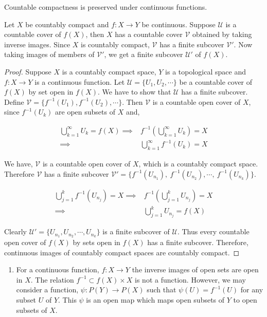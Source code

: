 \begin{theorem}
	Countable compactness is preserved under continuous functions.\cite[11.1.2]{joshi}
\end{theorem}
\begin{synopsis}
	Let $X$ be countably compact and $f:X\to Y$ be continuous. Suppose $\mathcal{U}$ is a countable cover of $f(X)$, then $X$ has a countable cover $\mathcal{V}$ obtained by taking inverse images. Since $X$ is countably compact, $\mathcal{V}$ has a finite subcover $\mathcal{V}'$. Now taking images of members of $\mathcal{V}'$, we get a finite subcover $\mathcal{U}'$ of $f(X)$.
\end{synopsis}
\begin{proof}
	Suppose $X$ is a countably compact space, $Y$ is a topological space and $f:X \to Y$ is a continuous function. Let $\mathcal{U} = \{ U_1, U_2,\cdots \}$ be a countable cover of $f(X)$ by set open in $f(X)$. We have to show that $\mathcal{U}$ has a finite subcover.\\

	Define $\mathcal{V} = \{ f^{-1}(U_1), f^{-1}(U_2), \cdots \}$. Then $\mathcal{V}$ is a countable open cover of $X$, since $f^{-1}(U_k)$ are open subsets of $X$ and,

\begin{align*}
	\bigcup_{k = 1}^\infty U_k = f(X) \implies & f^{-1}\left(\bigcup_{k=1}^\infty U_k\right) = X\\
	\implies & \bigcup_{k = 1}^\infty f^{-1}(U_k) = X
\end{align*}

	We have, $\mathcal{V}$ is a countable open cover of $X$, which is a countably compact space. Therefore $\mathcal{V}$ has a finite subcover $\mathcal{V}' = \{ f^{-1}(U_{n_1}),\ f^{-1}(U_{n_2}),\cdots,\ f^{-1}(U_{n_k}) \}$.

\begin{align*}
	\bigcup_{j=1}^k f^{-1}(U_{n_j}) = X \implies & f^{-1}\left(\bigcup_{j=1}^k U_{n_j}\right) = X\\
	\implies & \bigcup_{j=1}^k U_{n_j} = f(X)
\end{align*}

	Clearly $\mathcal{U}' = \{ U_{n_1},U_{n_2},\cdots,U_{n_k}\}$ is a finite subcover of $\mathcal{U}$. Thus every countable open cover of $f(X)$ by sets open in $f(X)$ has a finite subcover. Therefore, continuous images of countably compact spaces are countably compact.
\end{proof}

\begin{remark}
	\begin{enumerate}
		\item For a continuous function, $f : X \to Y$ the inverse images of open sets are open in $X$. The relation $f^{-1} \subset f(X) \times X$ is not a function. However, we may consider a function, $\psi : P(Y) \to P(X)$ such that $\psi(U) = f^{-1}(U)$ for any subset $U$ of $Y$. This $\psi$ is an open map which maps open subsets of $Y$ to open subsets of $X$.
	\end{enumerate}
\end{remark}

